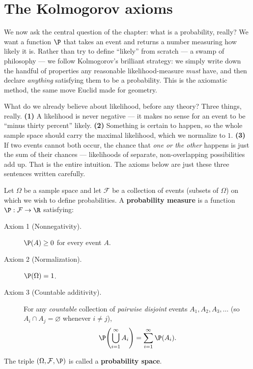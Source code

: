 \section{The Kolmogorov axioms}
\label{ch03:axioms}

We now ask the central question of the chapter: what is a probability, really?
We want a function $\P$ that takes an event and returns a number measuring how
likely it is. Rather than try to define ``likely'' from scratch --- a swamp of
philosophy --- we follow Kolmogorov's brilliant strategy: we simply write down
the handful of properties any reasonable likelihood-measure \emph{must} have, and
then declare \emph{anything} satisfying them to be a probability. This is the
axiomatic method, the same move Euclid made for geometry.

\begin{intuitionbox}
What do we already believe about likelihood, before any theory? Three things,
really. \textbf{(1)} A likelihood is never negative --- it makes no sense for an
event to be ``minus thirty percent'' likely. \textbf{(2)} Something is certain to
happen, so the whole sample space should carry the maximal likelihood, which we
normalize to $1$. \textbf{(3)} If two events cannot both occur, the chance that
\emph{one or the other} happens is just the sum of their chances --- likelihoods
of separate, non-overlapping possibilities add up. That is the entire intuition.
The axioms below are just these three sentences written carefully.
\end{intuitionbox}

\begin{definition}
\label{ch03:def-axioms}
Let $\Omega$ be a sample space and let $\mathcal{F}$ be a collection of events
(subsets of $\Omega$) on which we wish to define probabilities. A
\textbf{probability measure} is a function $\P : \mathcal{F} \to \R$ satisfying:
\begin{description}
\item[Axiom 1 (Nonnegativity).] $\P(A) \ge 0$ for every event $A$.
\item[Axiom 2 (Normalization).] $\P(\Omega) = 1$.
\item[Axiom 3 (Countable additivity).] For any \emph{countable} collection of
\emph{pairwise disjoint} events $A_1, A_2, A_3, \dots$ (so $A_i \cap A_j =
\varnothing$ whenever $i \ne j$),
\[
\P\!\left(\bigcup_{i=1}^{\infty} A_i\right) = \sum_{i=1}^{\infty} \P(A_i).
\]
\end{description}
The triple $(\Omega, \mathcal{F}, \P)$ is called a \textbf{probability space}.
\end{definition}

